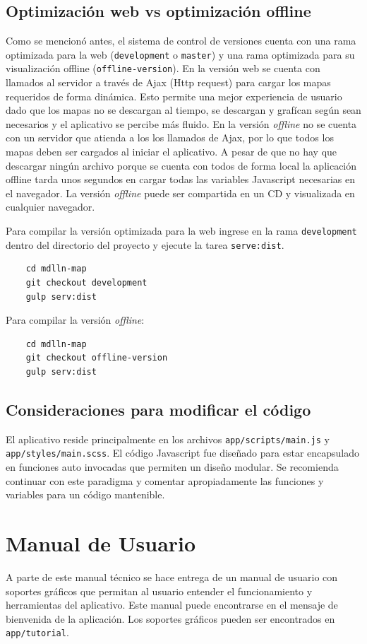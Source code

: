 \documentclass[11pt,letterpaper]{article}
\begin{document}
\subsection{Optimización web vs optimización offline}

Como se mencionó antes, el sistema de control de versiones cuenta con una rama optimizada para la web ({\tt development} o {\tt master}) y una rama optimizada para su visualización offline ({\tt offline-version}). En la versión web se cuenta con llamados al servidor a través de Ajax (Http request) para cargar los mapas requeridos de forma dinámica. Esto permite una mejor experiencia de usuario dado que los mapas no se descargan al tiempo, se descargan y grafícan según sean necesarios y el aplicativo se percibe más fluido. En la versión {\it offline} no se cuenta con un servidor que atienda a los los llamados de Ajax, por lo que todos los mapas deben ser cargados al iniciar el aplicativo. A pesar de que no hay que descargar ningún archivo porque se cuenta con todos de forma local la aplicación offline tarda unos segundos en cargar todas las variables Javascript necesarias en el navegador. La versión {\it offline} puede ser compartida en un CD y visualizada en cualquier navegador.

Para compilar la versión optimizada para la web ingrese en la rama {\tt development} dentro del directorio del proyecto y ejecute la tarea {\tt serve:dist}.
\begin{lstlisting}
	cd mdlln-map
  	git checkout development
  	gulp serv:dist
\end{lstlisting}
Para compilar la versión {\it offline}:
\begin{lstlisting}
	cd mdlln-map
  	git checkout offline-version
  	gulp serv:dist
\end{lstlisting}

\subsection{Consideraciones para modificar el código}
El aplicativo reside principalmente en los archivos {\tt app/scripts/main.js} y {\tt app/styles/main.scss}. El código Javascript fue diseñado para estar encapsulado en funciones auto invocadas que permiten un diseño modular. Se recomienda continuar con este paradigma y comentar apropiadamente las funciones y variables para un código mantenible.

\section{Manual de Usuario}
A parte de este manual técnico se hace entrega de un manual de usuario con soportes gráficos que permitan al usuario entender el funcionamiento y herramientas del aplicativo. Este manual puede encontrarse en el mensaje de bienvenida de la aplicación. Los soportes gráficos pueden ser encontrados en {\tt app/tutorial}.
\end{document}
